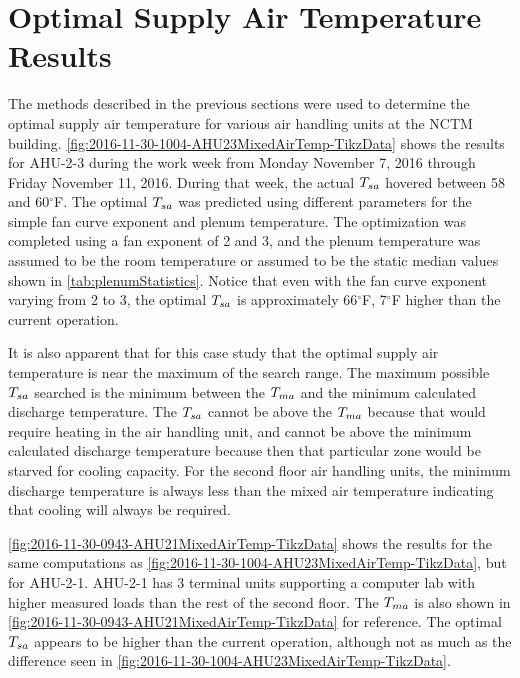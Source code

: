 \section{Optimal Supply Air Temperature Results}\label{sec:OptimalSupplyAirTemperatureResults}

The methods described in the previous sections were used to determine
the optimal supply air temperature for various air handling units at the
NCTM building.  \figref{}
\ref{fig:2016-11-30-1004-AHU23MixedAirTemp-TikzData} shows the results
for AHU-2-3 during the work week from Monday November 7, 2016 through
Friday November 11, 2016.  During that week, the actual \(T_{sa}\) hovered
between 58 and 60\(^\circ\)F. The optimal \(T_{sa}\) was predicted using
different parameters for the simple fan curve exponent and plenum
temperature.  The optimization was completed using a fan exponent of 2
and 3, and the plenum temperature was assumed to be the room temperature
or assumed to be the static median values shown in \tableref{}
\ref{tab:plenumStatistics}.  Notice that even with the fan curve
exponent varying from 2 to 3, the optimal \(T_{sa}\) is approximately
66\(^\circ\)F, 7\(^\circ\)F higher than the current operation. 

It is also apparent that for this case study that the optimal supply air
temperature is near the maximum of the search range.  The maximum
possible \(T_{sa}\) searched is the minimum between the \(T_{ma}\) and the
minimum calculated discharge temperature. The \(T_{sa}\) cannot be above
the \(T_{ma}\) because that would require heating in the air handling
unit, and cannot be above the minimum calculated discharge temperature
because then that particular zone would be starved for cooling capacity.
For the second floor air handling units, the minimum discharge
temperature is always less than the mixed air temperature indicating
that cooling will always be required.  

\figref{} \ref{fig:2016-11-30-0943-AHU21MixedAirTemp-TikzData} shows the
results for the same computations as \figref{}
\ref{fig:2016-11-30-1004-AHU23MixedAirTemp-TikzData}, but for AHU-2-1.
AHU-2-1 has 3 terminal units supporting a computer lab with higher
measured loads than the rest of the second floor.  The \(T_{ma}\) is also
shown in \figref{} \ref{fig:2016-11-30-0943-AHU21MixedAirTemp-TikzData}
for reference. The optimal \(T_{sa}\) appears to be higher than the
current operation, although not as much as the difference seen in
\figref{} \ref{fig:2016-11-30-1004-AHU23MixedAirTemp-TikzData}.


